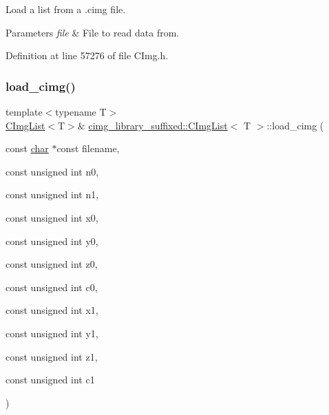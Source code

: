 Load a list from a .cimg file. 


\begin{DoxyParams}{Parameters}
{\em file} & File to read data from. \\
\hline
\end{DoxyParams}


Definition at line 57276 of file C\+Img.\+h.

\mbox{\label{structcimg__library__suffixed_1_1CImgList_a7c4bbbf202665c691ed8693a2dacbac8}} 
\subsubsection{\texorpdfstring{load\+\_\+cimg()}{load\_cimg()}\hspace{0.1cm}{\footnotesize\ttfamily [3/3]}}
{\footnotesize\ttfamily template$<$typename T$>$ \\
\hyperlink{structcimg__library__suffixed_1_1CImgList}{C\+Img\+List}$<$T$>$\& \hyperlink{structcimg__library__suffixed_1_1CImgList}{cimg\+\_\+library\+\_\+suffixed\+::\+C\+Img\+List}$<$ T $>$\+::load\+\_\+cimg (\begin{DoxyParamCaption}\item[{const \hyperlink{classchar}{char} $\ast$const}]{filename,  }\item[{const unsigned int}]{n0,  }\item[{const unsigned int}]{n1,  }\item[{const unsigned int}]{x0,  }\item[{const unsigned int}]{y0,  }\item[{const unsigned int}]{z0,  }\item[{const unsigned int}]{c0,  }\item[{const unsigned int}]{x1,  }\item[{const unsigned int}]{y1,  }\item[{const unsigned int}]{z1,  }\item[{const unsigned int}]{c1 }\end{DoxyParamCaption})\hspace{0.3cm}{\ttfamily [inline]}}



